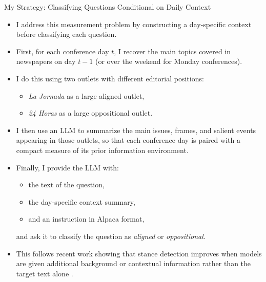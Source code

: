 \documentclass[10pt,aspectratio=169]{beamer}
\begin{document}
\begin{frame}{My Strategy: Classifying Questions Conditional on Daily Context}
\small
\begin{itemize}
    \item I address this measurement problem by constructing a day-specific context before classifying each question.
    
    \item First, for each conference day \(t\), I recover the main topics covered in newspapers on day \(t-1\) (or over the weekend for Monday conferences).
    
    \item I do this using two outlets with different editorial positions:
    \begin{itemize}
        \item \textit{La Jornada} as a large aligned outlet,
        \item \textit{24 Horas} as a large oppositional outlet.
    \end{itemize}

    \item I then use an LLM to summarize the main issues, frames, and salient events appearing in those outlets, so that each conference day is paired with a compact measure of its prior information environment.

    \item Finally, I provide the LLM with:
    \begin{itemize}
        \item the text of the question,
        \item the day-specific context summary,
        \item and an instruction in Alpaca format,
    \end{itemize}
    and ask it to classify the question as \textit{aligned} or \textit{oppositional}.

    \item This follows recent work showing that stance detection improves when models are given additional background or contextual information rather than the target text alone \parencite{li2023stance,sucu2025exploiting,lee2025journalism}.
\end{itemize}
\end{frame}

\begin{frame}[allowframebreaks]
    
    \typeout{}

    \singlespacing
    
    
    
\end{frame}
\end{document}
